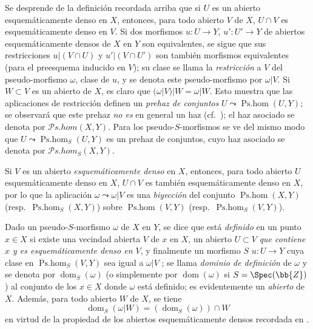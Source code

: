 \begin{env}[20.2.2]
\label{IV.20.2.2}

Se desprende de la definición recordada arriba que si $U$ es un abierto esquemáticamente denso en $X$, entonces, para todo abierto $V$ de $X$, $U\cap V$ es esquemáticamente denso en $V$.
Si dos morfismos $u:U\to Y$, $u':U'\to Y$ de abiertos esquemáticamente densos de $X$ en $Y$ son equivalentes, se sigue que sus restricciones $u|(V\cap U)$ y $u'|(V\cap U')$ son también morfismos equivalentes (para el preesquema inducido en $V$); su clase se llama la \emph{restricción} a $V$ del pseudo-morfismo $\omega$, clase de $u$, y se denota este pseudo-morfismo por $\omega|V$.
Si $W\subset V$ es un abierto de $X$, es claro que $(\omega|V)|W=\omega|W$.
Esto muestra que las aplicaciones de restricción definen un \emph{prehaz de conjuntos} $U\leadsto\operatorname{Ps.hom}(U,Y)$; se observará que este prehaz \emph{no es} en general un haz (cf.\ ); el haz asociado se denota por $\mathscr{P}\!s.\!\mathit{hom}(X,Y)$.
Para los pseudo-$S$-morfismos se ve del mismo modo que $U\leadsto\operatorname{Ps.hom}_S(U,Y)$ es un prehaz de conjuntos, cuyo haz asociado se denota por $\mathscr{P}\!s.\!\mathit{hom}_S(X,Y)$.

Si $V$ es un abierto \emph{esquemáticamente denso} en $X$, entonces, para todo abierto $U$ esquemáticamente denso en $X$, $U\cap V$ es también esquemáticamente denso en $X$, por lo que la aplicación $\omega\leadsto\omega|V$ es una \emph{biyección} del conjunto $\operatorname{Ps.hom}(X,Y)$ (resp.\ $\operatorname{Ps.hom}_S(X,Y)$) sobre $\operatorname{Ps.hom}(V,Y)$ (resp.\ $\operatorname{Ps.hom}_S(V,Y)$).
\end{env}

\begin{env}[20.2.3]
\label{IV.20.2.3}
Dado un pseudo-$S$-morfismo $\omega$ de $X$ en $Y$, se dice que está \emph{definido} en un punto $x\in X$ si existe una vecindad abierta $V$ de $x$ en $X$, un abierto $U\subset V$ \emph{que contiene $x$ y es esquemáticamente denso en $V$}, y finalmente un morfismo $S$ $u:U\to Y$ cuya clase en $\operatorname{Ps.hom}_S(V,Y)$ sea igual a $\omega|V$ ; se llama \emph{dominio de definición} de $\omega$ y se denota por $\operatorname{dom}_S(\omega)$ (o simplemente por $\operatorname{dom}(\omega)$ si $S=\Spec(\bb{Z})$) al conjunto de los $x\in X$ donde $\omega$ está definido; es evidentemente un \emph{abierto} de $X$.
Además, para todo abierto $W$ de $X$, se tiene
\[
\label{IV.20.2.3.1}
  \operatorname{dom}_S(\omega|W)=(\operatorname{dom}_S(\omega))\cap W
  \tag{20.2.3.1}
\]
en virtud de la propiedad de los abiertos esquemáticamente densos recordada en .
\end{env}

